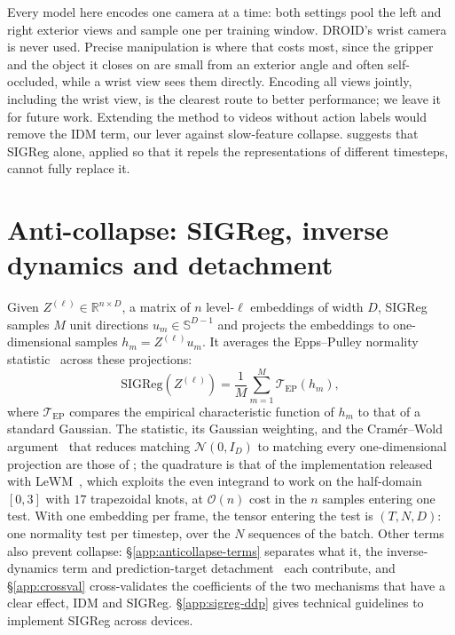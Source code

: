 Every model here encodes one camera at a time: both settings pool the left and right
exterior views and sample one per training window. DROID's wrist camera is never used. Precise
manipulation is where that costs most, since the gripper and the object it closes on are
small from an exterior angle and often self-occluded, while a wrist view sees them
directly. Encoding all views jointly, including the wrist view, is the clearest route to
better performance; we leave it for future work.
Extending the method to videos without action labels would remove the IDM term, our lever
against slow-feature collapse.  suggests that SIGReg alone, applied so
that it repels the representations of different timesteps, cannot fully replace it.

\section{Anti-collapse: SIGReg, inverse dynamics and detachment}
\label{app:epps-pulley}
\label{app:anticollapse}

Given $Z^{(\ell)} \in \mathbb{R}^{n \times D}$, a matrix of $n$ level-$\ell$
embeddings of width $D$, SIGReg samples $M$ unit directions
$u_m \in \mathbb{S}^{D-1}$ and projects the embeddings to one-dimensional
samples $h_m = Z^{(\ell)}u_m$. It averages the Epps--Pulley normality
statistic~\citep{epps1983test,balestriero2025lejepa} across these projections:
\begin{equation}
\label{eq:sigreg}
\mathrm{SIGReg}\!\left(Z^{(\ell)}\right)
= \frac{1}{M}\sum_{m=1}^{M} \mathcal{T}_{\mathrm{EP}}(h_m),
\end{equation}
where $\mathcal{T}_{\mathrm{EP}}$ compares the empirical characteristic
function of $h_m$ to that of a standard Gaussian.
The statistic, its Gaussian weighting,
and the Cram\'er--Wold argument~\citep{cramer1936theorems} that reduces matching $\mathcal{N}(0,I_D)$ to matching every one-dimensional projection are those of \citet{balestriero2025lejepa}; the quadrature is that of
the implementation released with LeWM~\citep{maes2026lewm}, which exploits the even integrand to
work on the half-domain $[0,3]$ with $17$ trapezoidal knots, at $\mathcal{O}(n)$ cost in the $n$
samples entering one test.
With one embedding per frame, the tensor entering the test is $(T, N, D)$: one normality
test per timestep, over the $N$ sequences of the batch. Other terms also prevent
collapse: \S\ref{app:anticollapse-terms} separates what
it, the inverse-dynamics term and prediction-target detachment~\cite{ponce2026dualperspectives} each contribute, and
\S\ref{app:crossval} cross-validates the coefficients of the two mechanisms that have a clear effect, IDM and SIGReg.
\S\ref{app:sigreg-ddp} gives technical guidelines to implement SIGReg across devices.

